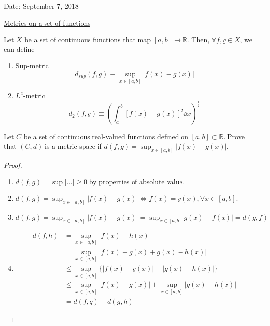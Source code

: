 \documentclass[twoside]{article}
\begin{document}

\hfill Date: September 7, 2018

\underline{Metrics on a set of functions}

Let $X$ be a set of continuous functions that map $[a,b] \to \mathbb{R}$. Then, $\forall f, g \in X$, we can define
\begin{enumerate}
    \item Sup-metric
    \begin{equation}
        d_{sup}(f,g) \equiv \sup_{x \in [a,b]} |f(x)-g(x)|
    \end{equation}
    \item $L^{2}$-metric
    \begin{equation}
        d_{2}(f,g) \equiv \left(\int_{a}^{b} \left[ f(x) - g(x) \right]^{2}  \dd x  \right )^{\frac{1}{2}}  
    \end{equation}
\end{enumerate}

\begin{lemma}
    Let $C$ be a set of continuous real-valued functions defined on $[a,b] \subset \mathbb{R}$. Prove that $(C,d)$ is a metric space if $d(f,g) = \sup_{x \in [a,b]} |f(x)-g(x)|$.
\end{lemma}
\begin{proof}
    \begin{enumerate}
        \item $d(f,g) = \sup |...| \geq 0$ by properties of absolute value.
        \item $d(f,g) = \sup_{x \in [a,b]} |f(x)-g(x)| \iff f(x) = g(x), \forall x \in [a,b].$
        \item $d(f,g) = \sup_{x \in [a,b]} |f(x)-g(x)| = \sup_{x \in [a,b]} g(x)-f(x)| = d(g,f)$ 
        \item $$\begin{aligned}
            d(f,h) 
            &= \sup_{x \in [a,b]} |f(x)-h(x)|\\
            &= \sup_{x \in [a,b]} |f(x)-g(x)+g(x)-h(x)|\\
            &\leq \sup_{x \in [a,b]} \Big \{ |f(x)-g(x)| + |g(x)-h(x)| \Big \}\\
            &\leq \sup_{x \in [a,b]} |f(x)-g(x)| + \sup_{x \in [a,b]} |g(x)-h(x)|\\
            &= d(f,g) + d(g,h)
        \end{aligned}$$
    \end{enumerate}
\end{proof}
 
\end{document}
